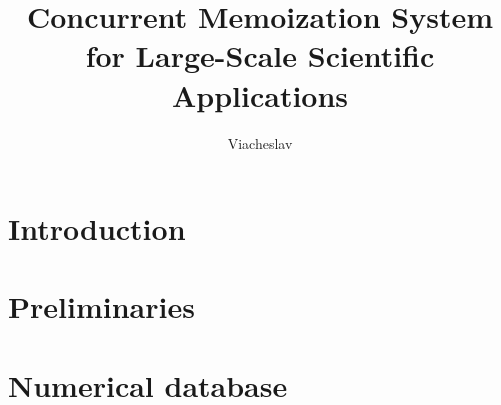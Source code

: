 \documentclass[thesis=B,english,hidelinks]{FITthesis}[2012/10/20]
\title{Concurrent Memoization System for Large-Scale Scientific Applications}
\author{Viacheslav} %
\begin{document}

\newcommand{\smplimage}[3][1]{
    \centerline{\texttt{[image: \#2.\#3]}}
}

\newcommand{\image}[4][1]{
\begin{figure}[H]
    \smplimage[#1]{#2}{#3}
	\caption{#4}
    \label{fig:#2}
\end{figure}
}

\newcommand{\func}[2]{\ensuremath{\textbf{\textit{#1}}(#2)}}
\newcommand{\nsnum}[2]{\ensuremath{\texttt{#1}_{#2}}}
\newcommand{\findop}{\func{find}{}\xspace}
\newcommand{\insertop}{\func{insert}{}\xspace}
\newcommand{\removeop}{\func{remove}{}\xspace}

\newcommand\blockitem[1][]{%
  \closepage\item[#1]\minipage[t]{\linewidth}%
  \let\closepage\endminipage%
  }
\newenvironment{block-description}{%
  \description
  \let\olditem\item
  \let\closepage\relax
}{%
  \closepage
  \enddescription
}

\setlength{\parindent}{0em}
\setlength{\parskip}{1em}


    \chapter{Introduction}
    


    \chapter{Preliminaries}
    \label{ch:pre}
    

    \chapter{Numerical database}
    \label{ch:numdb}
    
\end{document}
